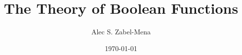 \documentclass[12pt, twoside]{book}
\title{The Theory of Boolean Functions}
\author{Alec S. Zabel-Mena}
\date{\today}
\begin{document}
\maketitle
\tableofcontents
\newpage



\nocite{*}



\end{document}
